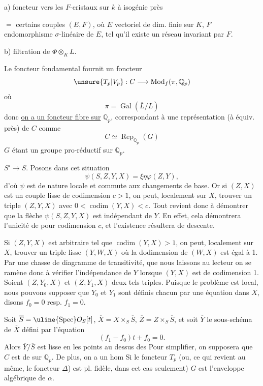 a) foncteur  vers les $F$-cristaux sur $k$ à isogénie près

$=$ certains couples $(E,F)$, où $E$ vectoriel de dim. finie sur $K$, $F$ endomorphisme $\sigma$-linéaire de $E$, tel qu'il existe un réseau invariant par $F$.

b) filtration de $\Phi\otimes_K L$.


Le foncteur fondamental  fournit un foncteur
\[
\unsure{T_p|V_p}:C\longrightarrow\operatorname{Mod}_f(\pi,\mathbb Q_p)
\]
où
\[
\pi=\operatorname{Gal}(\overline L/L)
\]
donc \uline{on a un foncteur fibre sur} $\mathbb Q_p$, correspondant à une représentation (à équiv. près) de $C$ comme
\[
C\simeq\operatorname{Rep}_{\mathbb Q_p}(G)
\]
$\boxed{G}$ étant un groupe pro-réductif sur $\mathbb Q_p$.

 $S'\longrightarrow S$. Posons dans cet situation
\[
\psi(S,Z,Y,X)=\xi\eta\varphi(Z,Y),
\]
d'où $\psi$ est de nature locale et commute aux changements de base. Or si $(Z,X)$ est un couple lisse de codimension $c>1$, on peut, localement sur $X$, trouver un triple $(Z,Y,X)$ avec $0<\operatorname{codim}(Y,X)<c$. Tout revient donc à démontrer que la flèche $\psi(S,Z,Y,X)$ est indépendant de $Y$. En effet, cela démontrera l'unicité de \qquad pour codimension $c$, et l'existence résultera de descente.

Si $(Z,Y,X)$ est arbitraire tel que $\operatorname{codim}(Y,X)>1$, on peut, localement sur $X$, trouver un triple lisse $(Y,W,X)$ où la dodimension de $(W,X)$ est égal à 1. Par une chasse de diagramme de transitivité, que nous laissons au lecteur\unsure{\}|,} on se ramène donc à vérifier l'indépendance de $Y$ lorsque $(Y,X)$ est de codimension 1. Soient  $(Z,Y_0,X)$ et $(Z,Y_1,X)$ deux tels triples. Puisque le problème est local, nous pouvons supposer que $Y_0$ et $Y_1$ sont définis chacun par une équation dans $X$, disons $f_0=0$ resp. $f_1=0$.

Soit $\overline S=\uline{\operatorname{Spec}}O_S[t]$, $\overline X=X\times_S\overline S$, $\overline Z=Z\times_S\overline S$, et soit $\overline Y$ le sous-schéma de $\overline X$ défini par l'équation
\[
(f_1-f_0)t+f_0=0.
\]
Alors $\overline Y/\overline S$ est lisse en les points au dessus des
Pour simplifier, on supposera que $C$ est de  sur $\mathbb Q_p$. De plus, on a un hom
Si le foncteur \deleted{\unsure{$\Phi$}} $T_p$ (ou, ce qui revient au même,  le foncteur $\Delta$) est pl. fidèle, dans cet cas seulement) $G$ est l'enveloppe algébrique de $\alpha$.

